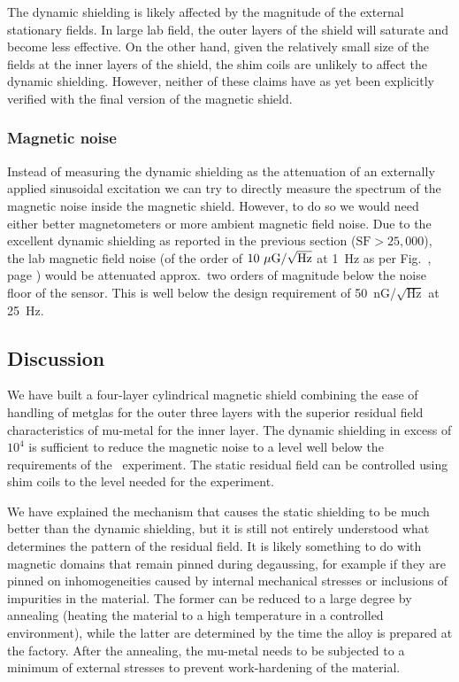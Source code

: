 The dynamic shielding is likely affected by the magnitude of the external
stationary fields. In large lab field, the outer layers of the shield will
saturate and become less effective. On the other hand, given the relatively
small size of the fields at the inner layers of the shield, the shim coils are
unlikely to affect the dynamic shielding. However, neither of these claims have
as yet been explicitly verified with the final version of the magnetic shield.

\subsubsection{Magnetic noise}
\label{magnetic:noise}

Instead of measuring the dynamic shielding as the attenuation of an externally
applied sinusoidal excitation we can try to directly measure the spectrum of the
magnetic noise inside the magnetic shield. However, to do so we would need
either better magnetometers or more ambient magnetic field noise. Due to the
excellent dynamic shielding as reported in the previous section
($\mathrm{SF}>25,000$), the lab magnetic field noise (of the order of
$10~\mu\mathrm{G}/\sqrt{\mathrm{Hz}}$ at 1~Hz as per Fig.~, page
\pageref{sensornoise}) would be attenuated approx.\ two orders of magnitude
below the noise floor of the sensor. This is well below the design requirement
of 50~nG/$\sqrt{\mathrm{Hz}}$ at 25~Hz.

\subsection{Discussion}

We have built a four-layer cylindrical magnetic shield combining the ease of
handling of metglas for the outer three layers with the superior residual field
characteristics of mu-metal for the inner layer. The dynamic shielding in excess
of $10^4$ is sufficient to reduce the magnetic noise to a level well below the
requirements of the \CENTREX\ experiment. The static residual field can be
controlled using shim coils to the level needed for the experiment.

We have explained the mechanism that causes the static shielding to be much
better than the dynamic shielding, but it is still not entirely understood what
determines the pattern of the residual field. It is likely something to do with
magnetic domains that remain pinned during degaussing, for example if they are
pinned on inhomogeneities caused by internal mechanical stresses or inclusions
of impurities in the material. The former can be reduced to a large degree by
annealing (heating the material to a high temperature in a controlled
environment), while the latter are determined by the time the alloy is prepared
at the factory. After the annealing, the mu-metal needs to be subjected to a
minimum of external stresses to prevent work-hardening of the material.

